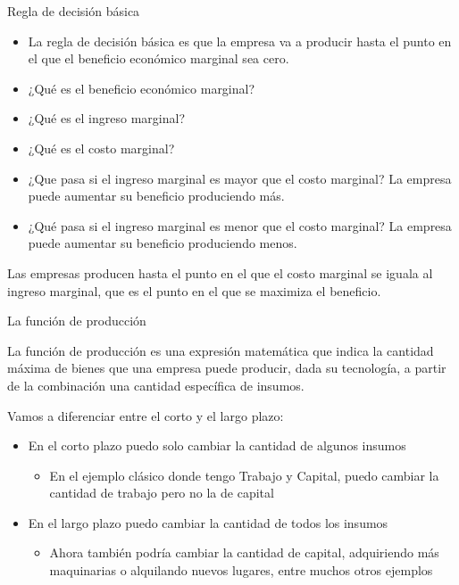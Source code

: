 \documentclass{beamer}
\begin{document}
\begin{frame}{Regla de decisión básica}

    \begin{itemize}
        \item La regla de decisión básica es que la empresa va a producir hasta el punto en el que el beneficio económico marginal sea cero.
        \item ¿Qué es el beneficio económico marginal?
        \item ¿Qué es el ingreso marginal?
        \item ¿Qué es el costo marginal?
        \item ¿Que pasa si el ingreso marginal es mayor que el costo marginal? La empresa puede aumentar su beneficio produciendo más.
        \item ¿Qué pasa si el ingreso marginal es menor que el costo marginal? La empresa puede aumentar su beneficio produciendo menos.
    \end{itemize}

    \begin{boxA}
        \begin{center}
            Las empresas producen hasta el punto en el que el costo marginal se iguala al ingreso marginal, que es el punto en el que se maximiza el beneficio.
        \end{center}
    \end{boxA}
\end{frame}

\begin{frame}{La función de producción}
    \begin{boxA}
        \begin{center}
            La función de producción es una expresión matemática que indica la cantidad máxima de bienes que una empresa puede producir, dada su tecnología, a partir de la combinación una cantidad específica de insumos.
        \end{center}
    \end{boxA}
    Vamos a diferenciar entre el corto y el largo plazo:
    \begin{itemize}
        \item En el corto plazo puedo solo cambiar la cantidad de algunos insumos
        \begin{itemize}
            \item En el ejemplo clásico donde tengo Trabajo y Capital, puedo cambiar la cantidad de trabajo pero no la de capital
        \end{itemize}
        \item En el largo plazo puedo cambiar la cantidad de todos los insumos
        \begin{itemize}
            \item Ahora también podría cambiar la cantidad de capital, adquiriendo más maquinarias o alquilando nuevos lugares, entre muchos otros ejemplos
        \end{itemize}
    \end{itemize}
\end{frame}
\end{document}
